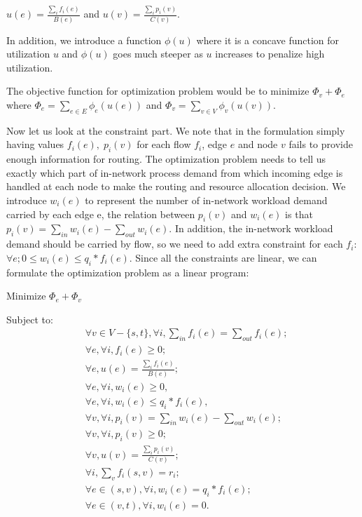 \documentclass[twocolumn]{article}
\begin{document}
$u(e) = \frac{\sum\limits_{i} f_{i}(e) } {B(e)}$ and $u(v) = \frac{\sum\limits_{i} p_i(v) } {C(v)} $.

In addition, we introduce a function $\phi(u)$ where it is a concave function for utilization $u$ and $\phi(u)$ goes much steeper as $u$ increases to penalize high utilization. 

The objective function for optimization problem would be to minimize $\Phi_v + \Phi_e$ where $\Phi_e = \sum\limits_{e\in E} \phi_e(u (e) )$ and $\Phi_v = \sum\limits_{v\in V} \phi_v(u (v) )$.

Now let us look at the constraint part. We note that in the formulation simply having values $f_i(e) ,\; p_i(v)$ for each flow $f_i$, edge $e$ and node $v$ fails to provide enough information for routing. The optimization problem needs to tell us exactly which part of in-network process demand from which incoming edge is handled at each node to make the routing and resource allocation decision. We introduce $w_i(e)$ to represent the number of in-network workload demand carried by each edge e, the relation between $p_i(v)$ and $w_i(e)$ is that $p_i(v) =  \sum\limits_{in } w_i(e) -  \sum\limits_{out} w_i(e)$. In addition, the in-network workload demand should be carried by flow, so we need to add extra constraint for each $f_i$: $\forall e; 0\leq w_i(e) \leq q_i*f_i(e)$. Since all the constraints are linear, we can formulate the optimization problem as a linear program:

Minimize  $\Phi_e + \Phi_v$

Subject to:
\begin{subequations}
\begin{align}
&\forall v \in V-\{s, t\}, \forall i, \sum\limits_{in}  f_i(e)=  \sum\limits_{out} f_i(e);\\
&\forall e,\forall  i, f_i(e) \geq 0;\\
&\forall e, u(e) = \frac{\sum\limits_{i} f_{i}(e) } {B(e)};\\
&\forall e,\forall  i, w_i(e) \geq 0,\\
&\forall e,\forall  i, w_i(e) \leq q_i* f_i(e),\\
&\forall v,\forall  i, p_i(v) =  \sum\limits_{in } w_i(e) -  \sum\limits_{out} w_i(e) ;\\
&\forall v,\forall  i, p_i(v) \geq 0; \\
&\forall v, u(v) = \frac{\sum\limits_{i} p_i(v) } {C(v)} ; \\
&\forall i, \sum\limits_v f_i(s, v) = r_i; \\
&\forall e\in(s, v),\forall  i, w_i(e) =q_i* f_i(e);\\
&\forall e\in(v,t), \forall i, w_i(e) =0.
\end{align}
\end{subequations}
\end{document}
